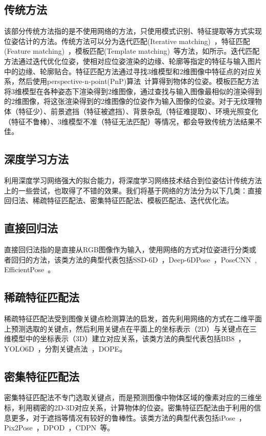 \subsection{传统方法}
\par 该部分传统方法指的是不使用网络的方法，只使用模式识别、特征提取等方式实现位姿估计的方法。传统方法可以分为迭代匹配(Iterative matching)~\cite{lowe1987three}，特征匹配(Feature matching)~\cite{rublee2011orb}，模板匹配(Template matching)~\cite{hinterstoisser2013model}等方法，如所示。迭代匹配方法通过迭代优化位姿，使相对应位姿渲染的边缘、轮廓等指定的特征与输入图片中的边缘、轮廓贴合。特征匹配方法通过寻找3维模型和2维图像中特征点的对应关系，然后使用perspective-n-point(PnP)算法~\cite{lepetit2009ep}计算得到物体的位姿。模板匹配方法将3维模型在各种姿态下渲染得到2维图像，通过查找与输入图像最相似的渲染得到的2维图像，将这张渲染得到的2维图像的位姿作为输入图像的位姿。对于无纹理物体（特征少）、前景遮挡（特征被遮挡）、背景杂乱（特征难提取）、环境光照变化（特征不鲁棒）、3维模型不准（特征无法匹配）等情况，都会导致传统方法结果不佳。
\subsection{深度学习方法}
\par 利用深度学习网络强大的拟合能力，将深度学习网络技术结合到位姿估计传统方法上的一些尝试，也取得了不错的效果。我们将基于网络的方法分为以下几类：直接回归法、稀疏特征匹配法、密集特征匹配法、模板匹配法、迭代优化法。
\subsection{直接回归法}
\par 直接回归法指的是直接从RGB图像作为输入，使用网络的方式对位姿进行分类或者回归的方法，该类方法的典型代表包括SSD-6D~\cite{kehl2017ssd}，Deep-6DPose~\cite{do2018deep}，PoseCNN~\cite{xiang2017posecnn}, EfficientPose~\cite{bukschat2020efficientpose}。
\subsection{稀疏特征匹配法}
\par 稀疏特征匹配法受到图像关键点检测算法的启发，首先利用网络的方式在二维平面上预测选取的关键点，然后利用关键点在平面上的坐标表示（2D）与关键点在三维模型中的坐标表示（3D）建立对应关系，该类方法的典型代表包括BB8~\cite{rad2017bb8}，YOLO6D~\cite{tekin2018real}，分割关键点法~\cite{hu2019segmentation}，DOPE。
\subsection{密集特征匹配法}
\par 密集特征匹配法不专门选取关键点，而是预测图像中物体区域的像素对应的三维坐标，利用稠密的2D-3D对应关系，计算物体的位姿。密集特征匹配法由于利用的信息更多，对于遮挡等情况有较好的鲁棒性。该类方法的典型代表包括iPose~\cite{hosseini2019ipose}，Pix2Pose~\cite{park2019pix2pose}，DPOD~\cite{zakharov2019dpod}，CDPN~\cite{li2019cdpn}等。
